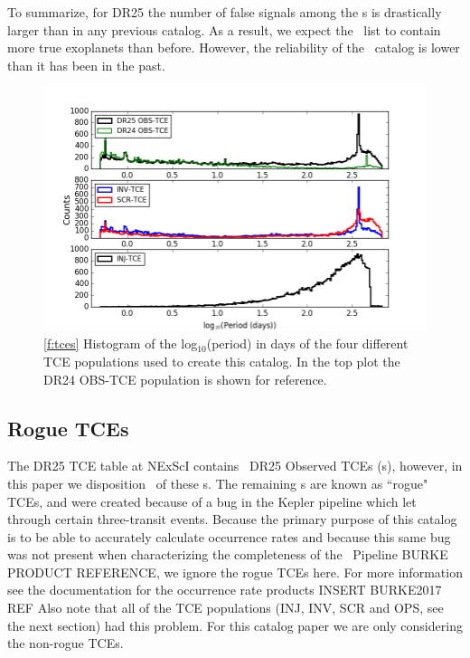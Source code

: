 To summarize, for DR25 the number of false signals among the \opstce s  is drastically larger than in any previous catalog. As a result, we expect the \opstce\ list to contain more true exoplanets than before. However, the reliability of the \opstce\ catalog is lower than it has been in the past.   

\begin{figure}[h!]
 \begin{center}
  \includegraphics[width=1.0\linewidth]{fig-tcePeriods.png}
  \caption{\ref{f:tces} Histogram of the log$_{10}$(period) in days of the four different TCE populations used to create this catalog. In the top plot the DR24 OBS-TCE population is shown for reference.}
 \end{center}
 \end{figure}



\subsection{Rogue TCEs}
The DR25 TCE table at NExScI contains \ntces\ DR25 Observed TCEs (\opstce s), however, in this paper we disposition \ntcesnorogue\ of these \opstce s. The remaining \opstce s are known as ``rogue" TCEs, and were created because of a bug in the Kepler pipeline which let through certain three-transit events. Because the primary purpose of this catalog is to be able to accurately calculate occurrence rates and because this same bug was not present when characterizing the completeness of the \Kepler\ Pipeline \citep{}BURKE PRODUCT REFERENCE, we ignore the rogue TCEs here. For more information see the documentation for the occurrence rate products INSERT BURKE2017 REF%
Also note that all of the TCE populations (INJ, INV, SCR and OPS, see the next section) had this problem. For this catalog paper we are only considering the non-rogue TCEs.

